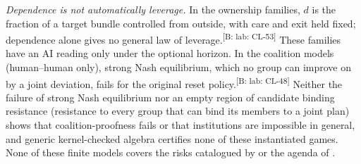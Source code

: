 \documentclass[pdflatex,sn-basic]{sn-jnl}%
\newcommand{\claim}[2]{\ifannotated\textsuperscript{\textcolor{blue!60!black}{\tiny[#1: #2]}}\fi}
\begin{document}
\emph{Dependence is not automatically leverage.} In the ownership families, $d$ is the fraction of a target bundle controlled from outside, with care and exit held fixed; dependence alone gives no general law of leverage.\claim{B: lab}{CL-53} These families have an AI reading only under the optional horizon. In the coalition models (human--human only), strong Nash equilibrium, which no group can improve on by a joint deviation, fails for the original reset policy.\claim{B: lab}{CL-48} Neither the failure of strong Nash equilibrium nor an empty region of candidate binding resistance (resistance to every group that can bind its members to a joint plan) shows that coalition-proofness fails or that institutions are impossible in general, and generic kernel-checked algebra certifies none of these instantiated games. None of these finite models covers the risks catalogued by \citet{hammond2025} or the agenda of \citet{conitzer2023}.
\end{document}
